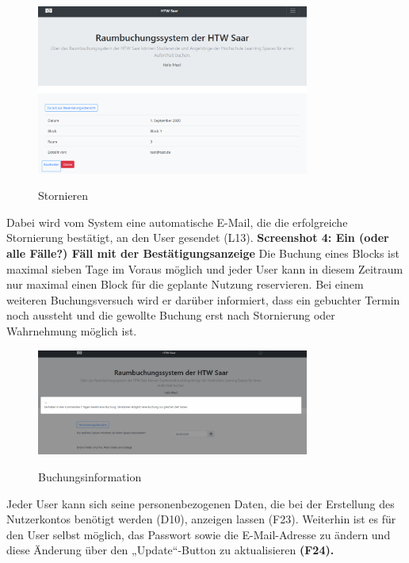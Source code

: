 \documentclass[a4paper,report,headsepline]{scrreprt}
\begin{document}
\clearpage
\begin{figure}[h]
    \centering
    \caption{Stornieren}
    \includegraphics[width=0.8\textwidth]{Stornieren}
    \label{fig:Stornieren}
\end{figure}
Dabei wird vom System eine automatische E-Mail, die die erfolgreiche Stornierung bestätigt, an den User gesendet (L13).
{\huge \textbf{Screenshot 4: Ein (oder alle Fälle?) Fäll mit der Bestätigungsanzeige}}
Die Buchung eines Blocks ist maximal sieben Tage im Voraus möglich und jeder User kann in diesem Zeitraum nur maximal einen Block für die geplante Nutzung reservieren. Bei einem weiteren Buchungsversuch wird er darüber informiert, dass ein gebuchter Termin noch aussteht und die gewollte Buchung erst nach Stornierung oder Wahrnehmung möglich ist.
\begin{figure}[h]
    \centering
    \caption{Buchungsinformation}
    \includegraphics[width=0.8\textwidth]{Buchungsinformation}
    \label{fig:Buchungsinformation}
\end{figure}
\clearpage
Jeder User kann sich seine personenbezogenen Daten, die bei der Erstellung des Nutzerkontos benötigt werden (D10), anzeigen lassen (F23). Weiterhin ist es für den User selbst möglich, das Passwort sowie die E-Mail-Adresse zu ändern und diese Änderung über den „Update“-Button zu aktualisieren \textbf{{\LARGE (F24).}}
\end{document}
